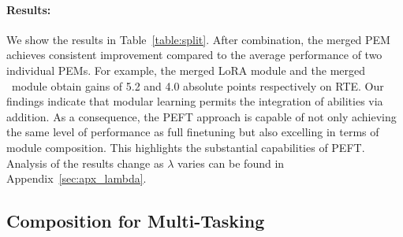 \paragraph{Results:}
We show the results in Table~\ref{table:split}.
After combination, the merged PEM achieves consistent improvement compared to the average performance of two individual PEMs. 
For example, the merged LoRA module and the merged \ia~module obtain gains of 5.2 and 4.0 absolute points respectively on RTE.
Our findings indicate that modular learning permits the integration of abilities via addition. As a consequence, the PEFT approach is capable of not only achieving the same level of performance as full finetuning but also excelling in terms of module composition. This highlights the substantial capabilities of PEFT.
Analysis of the results change as $\lambda$ varies can be found in Appendix~\ref{sec:apx_lambda}.


\subsection{Composition for Multi-Tasking}
\label{sec:multitask}

